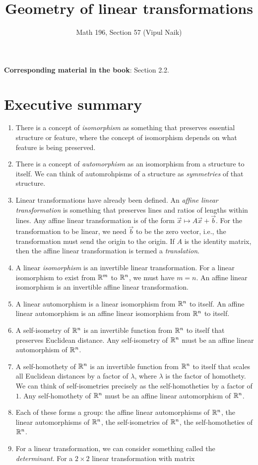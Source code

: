 \documentclass[10pt]{amsart}
\title{Geometry of linear transformations}
\author{Math 196, Section 57 (Vipul Naik)}
\begin{document}
\maketitle

{\bf Corresponding material in the book}: Section 2.2.

\section*{Executive summary}

\begin{enumerate}
\item There is a concept of {\em isomorphism} as something that
  preserves essential structure or feature, where the concept of
  isomorphism depends on what feature is being preserved.
\item There is a concept of {\em automorphism} as an isomorphism from
  a structure to itself. We can think of automrohpisms of a structure
  as {\em symmetries} of that structure.
\item Linear transformations have already been defined. An {\em affine
  linear transformation} is something that preserves lines and ratios
  of lengths within lines. Any affine linear transformation is of the
  form $\vec{x} \mapsto A\vec{x} + \vec{b}$. For the transformation to
  be linear, we need $\vec{b}$ to be the zero vector, i.e., the
  transformation must send the origin to the origin. If $A$ is the
  identity matrix, then the affine linear transformation is termed a
  {\em translation}.
\item A linear {\em isomorphism} is an invertible linear
  transformation. For a linear isomorphism to exist from $\mathbb{R}^m$ to
  $\mathbb{R}^n$, we must have $m = n$. An affine linear isomorphism is an
  invertible affine linear transformation.
\item A linear automorphism is a linear isomorphism from $\mathbb{R}^n$ to
  itself. An affine linear automorphism is an affine linear
  isomorphism from $\mathbb{R}^n$ to itself.
\item A self-isometry of $\mathbb{R}^n$ is an invertible function from $\mathbb{R}^n$
  to itself that preserves Euclidean distance. Any self-isometry of
  $\mathbb{R}^n$ must be an affine linear automorphism of $\mathbb{R}^n$.
\item A self-homothety of $\mathbb{R}^n$ is an invertible function from $\mathbb{R}^n$
  to itself that scales all Euclidean distances by a factor of
  $\lambda$, where $\lambda$ is the factor of homothety. We can think
  of self-isometries precisely as the self-homotheties by a factor of
  $1$. Any self-homothety of $\mathbb{R}^n$ must be an affine linear
  automorphism of $\mathbb{R}^n$.
\item Each of these forms a group: the affine linear automorphisms of
  $\mathbb{R}^n$, the linear automorphisms of $\mathbb{R}^n$, the self-isometries of
  $\mathbb{R}^n$, the self-homotheties of $\mathbb{R}^n$.
\item For a linear transformation, we can consider something called
  the {\em determinant}. For a $2 \times 2$ linear transformation with
  matrix


\end{enumerate}
\end{document}
